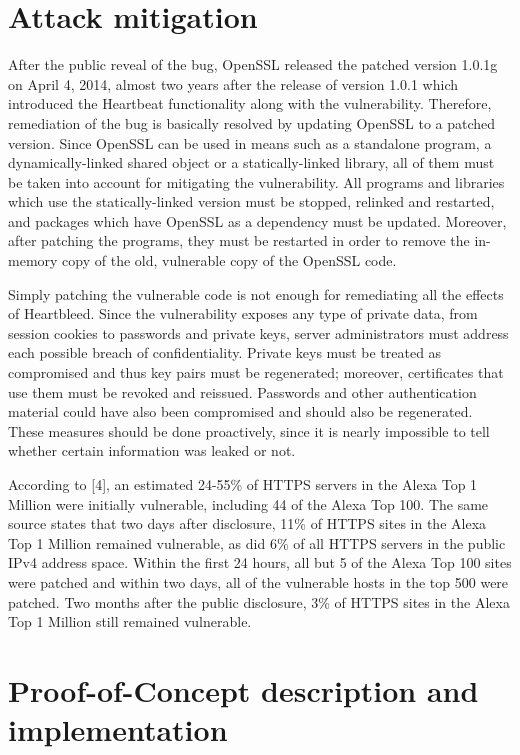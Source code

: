\documentclass[12pt,a4paper,english,onecolumn]{IEEEtran}
\begin{document}
\section{Attack mitigation}

After the public reveal of the bug, OpenSSL released the patched version 1.0.1g on April 4, 2014, almost two years after the release of version 1.0.1 which introduced the Heartbeat functionality along with the vulnerability. Therefore, remediation of the bug is basically resolved by updating OpenSSL to a patched version. Since OpenSSL can be used in means such as a standalone program, a dynamically-linked shared object or a statically-linked library, all of them must be taken into account for mitigating the vulnerability. All programs and libraries which use the statically-linked version must be stopped, relinked and restarted, and packages which have OpenSSL as a dependency must be updated. Moreover, after patching the programs, they must be restarted in order to remove the in-memory copy of the old, vulnerable copy of the OpenSSL code. \par
	Simply patching the vulnerable code is not enough for remediating all the effects of Heartbleed. Since the vulnerability exposes any type of private data, from session cookies to passwords and private keys, server administrators must address each possible breach of confidentiality. Private keys must be treated as compromised and thus key pairs must be regenerated; moreover, certificates that use them must be revoked and reissued. Passwords and other authentication material could have also been compromised and should also be regenerated. These measures should be done proactively, since it is nearly impossible to tell whether certain information was leaked or not. \par
	According to [4], an estimated 24-55\% of HTTPS servers in the Alexa Top 1 Million were initially vulnerable, including 44 of the Alexa Top 100. The same source states that two days after disclosure, 11\% of HTTPS sites in the Alexa Top 1 Million remained vulnerable, as did 6\% of all HTTPS servers in the public IPv4 address space. Within the first 24 hours, all but 5 of the Alexa Top 100 sites were patched and within two days, all of the vulnerable hosts in the top 500 were patched. Two months after the public disclosure, 3\% of HTTPS sites in the Alexa Top 1 Million still remained vulnerable. \par

\section{Proof-of-Concept description and implementation}
\end{document}
